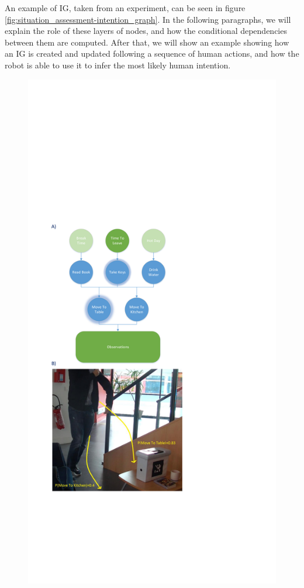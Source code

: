 An example of IG, taken from an experiment, can be seen in figure \ref{fig:situation_assessment-intention_graph}. In the following paragraphs, we will explain the role of these layers of nodes, and how the conditional dependencies between them are computed. After that, we will show an example showing how an IG is created and updated following a sequence of human actions, and how the robot is able to use it to infer the most likely human intention.

 \begin{figure}[ht!]
	\centering
	\includegraphics[trim={2cm 11cm 11cm 17cm},clip,scale=0.45]{img/situation_assessment/cookieScenario.pdf}

\end{figure}
